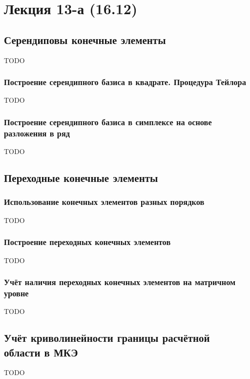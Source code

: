 \section{Лекция 13-а (16.12)}
\subsection{Серендиповы конечные элементы}
TODO
\subsubsection{Построение серендипного базиса в квадрате. Процедура Тейлора}
TODO
\subsubsection{Построение серендипного базиса в симплексе на основе разложения в ряд}
TODO
\subsection{Переходные конечные элементы}
\subsubsection{Использование конечных элементов разных порядков}
TODO
\subsubsection{Построение переходных конечных элементов}
TODO
\subsubsection{Учёт наличия переходных конечных элементов на матричном уровне}
TODO
\subsection{Учёт криволинейности границы расчётной области в МКЭ}
TODO

